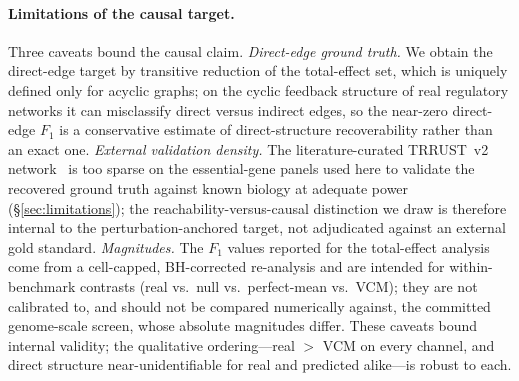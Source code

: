 \documentclass{article}
\theoremstyle{plain}
\theoremstyle{definition}
\theoremstyle{remark}
\begin{document}
\paragraph{Limitations of the causal target.}
Three caveats bound the causal claim. \emph{Direct-edge ground truth.} We obtain the direct-edge target by transitive reduction of the total-effect set, which is uniquely defined only for acyclic graphs; on the cyclic feedback structure of real regulatory networks it can misclassify direct versus indirect edges, so the near-zero direct-edge $F_1$ is a conservative estimate of direct-structure recoverability rather than an exact one. \emph{External validation density.} The literature-curated TRRUST~v2 network~\citep{han2018trrust} is too sparse on the essential-gene panels used here to validate the recovered ground truth against known biology at adequate power (\S\ref{sec:limitations}); the reachability-versus-causal distinction we draw is therefore internal to the perturbation-anchored target, not adjudicated against an external gold standard. \emph{Magnitudes.} The $F_1$ values reported for the total-effect analysis come from a cell-capped, BH-corrected re-analysis and are intended for within-benchmark contrasts (real vs.\ null vs.\ perfect-mean vs.\ VCM); they are not calibrated to, and should not be compared numerically against, the committed genome-scale screen, whose absolute magnitudes differ. These caveats bound internal validity; the qualitative ordering---real $>$ VCM on every channel, and direct structure near-unidentifiable for real and predicted alike---is robust to each.

\end{document}
